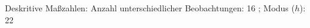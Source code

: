 				\label{tableValues:bfec152h_g3r}
				\vspace*{-\baselineskip}
                    \begin{noten}
                	    \note{} Deskritive Maßzahlen:
                	    Anzahl unterschiedlicher Beobachtungen: 16%
                	    ; 
                	      Modus ($h$): 22
                     \end{noten}


